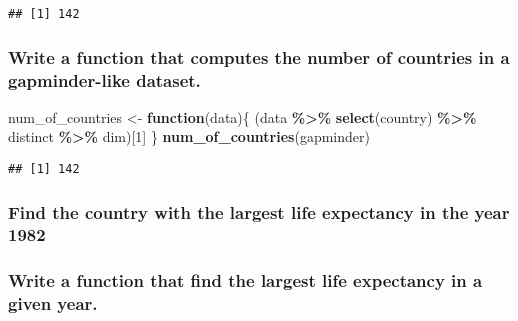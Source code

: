 \documentclass[
]{article}
\newenvironment{Shaded}{\begin{snugshade}}{\end{snugshade}}
\newcommand{\ControlFlowTok}[1]{\textcolor[rgb]{0.13,0.29,0.53}{\textbf{#1}}}
\newcommand{\DecValTok}[1]{\textcolor[rgb]{0.00,0.00,0.81}{#1}}
\newcommand{\FunctionTok}[1]{\textcolor[rgb]{0.13,0.29,0.53}{\textbf{#1}}}
\newcommand{\NormalTok}[1]{#1}
\newcommand{\OtherTok}[1]{\textcolor[rgb]{0.56,0.35,0.01}{#1}}
\newcommand{\SpecialCharTok}[1]{\textcolor[rgb]{0.81,0.36,0.00}{\textbf{#1}}}
\begin{document}
\begin{verbatim}
## [1] 142
\end{verbatim}

\hypertarget{write-a-function-that-computes-the-number-of-countries-in-a-gapminder-like-dataset.}{%
\subsubsection{Write a function that computes the number of countries in
a gapminder-like
dataset.}\label{write-a-function-that-computes-the-number-of-countries-in-a-gapminder-like-dataset.}}

\begin{Shaded}
\begin{Highlighting}[]
\NormalTok{num\_of\_countries }\OtherTok{\textless{}{-}} \ControlFlowTok{function}\NormalTok{(data)\{}
\NormalTok{    (data }\SpecialCharTok{\%\textgreater{}\%} \FunctionTok{select}\NormalTok{(country) }\SpecialCharTok{\%\textgreater{}\%}\NormalTok{ distinct }\SpecialCharTok{\%\textgreater{}\%}\NormalTok{ dim)[}\DecValTok{1}\NormalTok{]}
\NormalTok{\}}
\FunctionTok{num\_of\_countries}\NormalTok{(gapminder)}
\end{Highlighting}
\end{Shaded}

\begin{verbatim}
## [1] 142
\end{verbatim}

\hypertarget{find-the-country-with-the-largest-life-expectancy-in-the-year-1982}{%
\subsubsection{Find the country with the largest life expectancy in the
year
1982}\label{find-the-country-with-the-largest-life-expectancy-in-the-year-1982}}

\begin{Shaded}
\end{Shaded}

\hypertarget{write-a-function-that-find-the-largest-life-expectancy-in-a-given-year.}{%
\subsubsection{Write a function that find the largest life expectancy in
a given
year.}\label{write-a-function-that-find-the-largest-life-expectancy-in-a-given-year.}}
\end{document}
